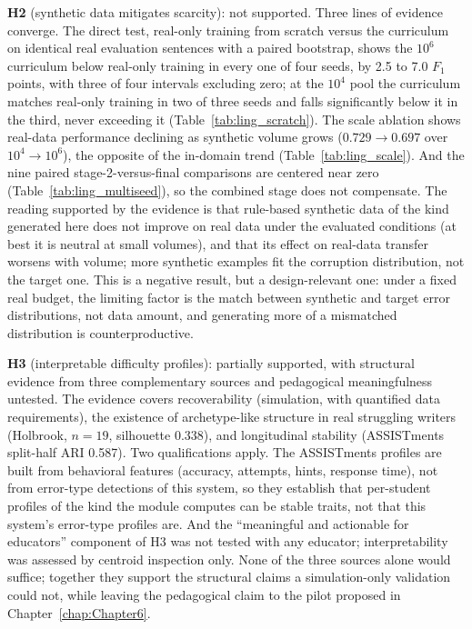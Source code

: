 \textbf{H2} (synthetic data mitigates scarcity): not supported. Three lines of evidence converge. The direct test, real-only training from scratch versus the curriculum on identical real evaluation sentences with a paired bootstrap, shows the $10^6$ curriculum below real-only training in every one of four seeds, by 2.5 to 7.0 $F_1$ points, with three of four intervals excluding zero; at the $10^4$ pool the curriculum matches real-only training in two of three seeds and falls significantly below it in the third, never exceeding it (Table~\ref{tab:ling_scratch}). The scale ablation shows real-data performance declining as synthetic volume grows ($0.729 \rightarrow 0.697$ over $10^4 \rightarrow 10^6$), the opposite of the in-domain trend (Table~\ref{tab:ling_scale}). And the nine paired stage-2-versus-final comparisons are centered near zero (Table~\ref{tab:ling_multiseed}), so the combined stage does not compensate. The reading supported by the evidence is that rule-based synthetic data of the kind generated here does not improve on real data under the evaluated conditions (at best it is neutral at small volumes), and that its effect on real-data transfer worsens with volume; more synthetic examples fit the corruption distribution, not the target one. This is a negative result, but a design-relevant one: under a fixed real budget, the limiting factor is the match between synthetic and target error distributions, not data amount, and generating more of a mismatched distribution is counterproductive.

\textbf{H3} (interpretable difficulty profiles): partially supported, with structural evidence from three complementary sources and pedagogical meaningfulness untested. The evidence covers recoverability (simulation, with quantified data requirements), the existence of archetype-like structure in real struggling writers (Holbrook, $n=19$, silhouette $0.338$), and longitudinal stability (ASSISTments split-half ARI 0.587). Two qualifications apply. The ASSISTments profiles are built from behavioral features (accuracy, attempts, hints, response time), not from error-type detections of this system, so they establish that per-student profiles of the kind the module computes can be stable traits, not that this system's error-type profiles are. And the ``meaningful and actionable for educators'' component of H3 was not tested with any educator; interpretability was assessed by centroid inspection only. None of the three sources alone would suffice; together they support the structural claims a simulation-only validation could not, while leaving the pedagogical claim to the pilot proposed in Chapter~\ref{chap:Chapter6}.

